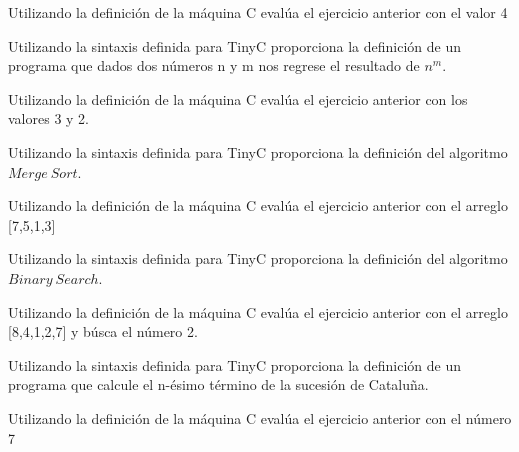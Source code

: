 \bigskip

\begin{exercise}
    Utilizando la definición de la máquina C evalúa el ejercicio anterior con el valor 4
\end{exercise}

\bigskip

\begin{exercise}
    Utilizando la sintaxis definida para \textsf{TinyC} proporciona la definición de un programa que dados dos números n y m nos regrese el resultado de $n^m$.
\end{exercise}

\bigskip

\begin{exercise}
    Utilizando la definición de la máquina C evalúa el ejercicio anterior con los valores 3 y 2.
\end{exercise}

\bigskip

\begin{exercise}
    Utilizando la sintaxis definida para \textsf{TinyC} proporciona la definición del algoritmo $Merge\ Sort$.
\end{exercise}

\bigskip

\begin{exercise}
    Utilizando la definición de la máquina C evalúa el ejercicio anterior con el arreglo [7,5,1,3]
\end{exercise}

\bigskip

\begin{exercise}
    Utilizando la sintaxis definida para \textsf{TinyC} proporciona la definición del algoritmo $Binary\ Search$.
\end{exercise}

\bigskip

\begin{exercise}
    Utilizando la definición de la máquina C evalúa el ejercicio anterior con el arreglo [8,4,1,2,7] y búsca el número 2.
\end{exercise}


\bigskip

\begin{exercise}
    Utilizando la sintaxis definida para \textsf{TinyC} proporciona la definición de un programa que calcule el n-ésimo término de la sucesión de Cataluña.
\end{exercise}

\bigskip

\begin{exercise}
    Utilizando la definición de la máquina C evalúa el ejercicio anterior con el número 7
\end{exercise}

